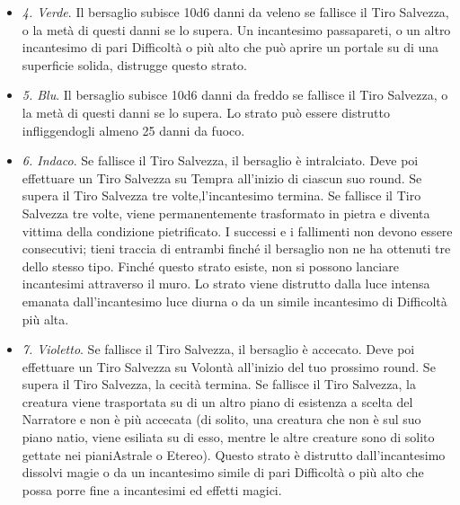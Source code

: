 \begin{multicols}{2}
\begin{itemize}
\textit{2. Arancio}. Il bersaglio subisce 10d6 danni da acido se fallisce il Tiro Salvezza, o la metà di questi danni se lo supera. Finché questo strato esiste, gli attacchi a distanza magici non possono attraversare il muro. Lo strato può essere distrutto da un forte vento. 3. Giallo. Il bersaglio subisce 10d6 danni da fulmine se fallisce il Tiro Salvezza, o la metà di questi danni se lo supera. Questo strato può essere distrutto infliggendogli 60 danni di forza.
\item
\textit{4. Verde}. Il bersaglio subisce 10d6 danni da veleno se fallisce il Tiro Salvezza, o la metà di questi danni se lo supera. Un incantesimo passapareti, o un altro incantesimo di pari Difficoltà o più alto che può aprire un portale su di una superficie solida, distrugge questo strato.
\item
\textit{5. Blu}. Il bersaglio subisce 10d6 danni da freddo se fallisce il Tiro Salvezza, o la metà di questi danni se lo supera. Lo strato può essere distrutto infliggendogli almeno 25 danni da fuoco.
\item
\textit{6. Indaco}. Se fallisce il Tiro Salvezza, il bersaglio è intralciato. Deve poi effettuare un Tiro Salvezza su Tempra all'inizio di ciascun suo round. Se supera il Tiro Salvezza tre volte,l'incantesimo termina. Se fallisce il Tiro Salvezza tre volte, viene permanentemente trasformato in pietra e diventa vittima della condizione pietrificato. I successi e i fallimenti non devono essere consecutivi; tieni traccia di entrambi finché il bersaglio non ne ha ottenuti tre dello stesso tipo. Finché questo strato esiste, non si possono lanciare incantesimi attraverso il muro. Lo strato viene distrutto dalla luce intensa emanata dall'incantesimo luce diurna o da un simile incantesimo di Difficoltà più alta.
\item
\textit{7. Violetto}. Se fallisce il Tiro Salvezza, il bersaglio è accecato. Deve poi effettuare un Tiro Salvezza su Volontà all'inizio del tuo prossimo round. Se supera il Tiro Salvezza, la cecità termina. Se fallisce il Tiro Salvezza, la creatura viene trasportata su di un altro piano di esistenza a scelta del Narratore e non è più accecata (di solito, una creatura che non è sul suo piano natio, viene esiliata su di esso, mentre le altre creature sono di solito gettate nei pianiAstrale o Etereo). Questo strato è distrutto dall'incantesimo dissolvi magie o da un incantesimo simile di pari Difficoltà o più alto che possa porre fine a incantesimi ed effetti magici.
\end{itemize}


\end{multicols}
